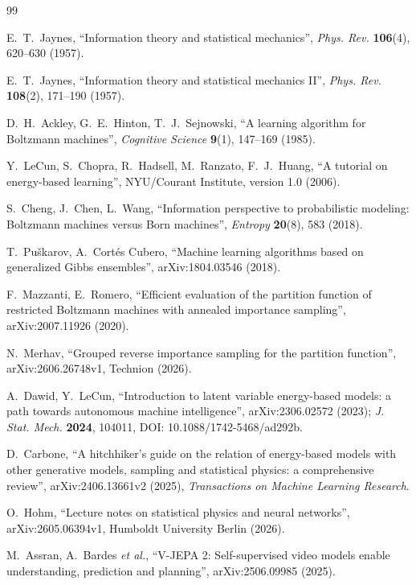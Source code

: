 \documentclass[12pt]{article}
\begin{document}
\begin{thebibliography}{99}

E.~T.~Jaynes, ``Information theory and statistical mechanics'', \textit{Phys. Rev.} \textbf{106}(4), 620--630 (1957).

E.~T.~Jaynes, ``Information theory and statistical mechanics II'', \textit{Phys. Rev.} \textbf{108}(2), 171--190 (1957).

D.~H.~Ackley, G.~E.~Hinton, T.~J.~Sejnowski, ``A learning algorithm for Boltzmann machines'', \textit{Cognitive Science} \textbf{9}(1), 147--169 (1985).

Y.~LeCun, S.~Chopra, R.~Hadsell, M.~Ranzato, F.~J.~Huang, ``A tutorial on energy-based learning'', NYU/Courant Institute, version 1.0 (2006).

S.~Cheng, J.~Chen, L.~Wang, ``Information perspective to probabilistic modeling: Boltzmann machines versus Born machines'', \textit{Entropy} \textbf{20}(8), 583 (2018).

T.~Puškarov, A.~Cortés Cubero, ``Machine learning algorithms based on generalized Gibbs ensembles'', arXiv:1804.03546 (2018).

F.~Mazzanti, E.~Romero, ``Efficient evaluation of the partition function of restricted Boltzmann machines with annealed importance sampling'', arXiv:2007.11926 (2020).

N.~Merhav, ``Grouped reverse importance sampling for the partition function'', arXiv:2606.26748v1, Technion (2026).

A.~Dawid, Y.~LeCun, ``Introduction to latent variable energy-based models: a path towards autonomous machine intelligence'', arXiv:2306.02572 (2023); \textit{J. Stat. Mech.} \textbf{2024}, 104011, DOI: 10.1088/1742-5468/ad292b.

D.~Carbone, ``A hitchhiker's guide on the relation of energy-based models with other generative models, sampling and statistical physics: a comprehensive review'', arXiv:2406.13661v2 (2025), \textit{Transactions on Machine Learning Research}.

O.~Hohm, ``Lecture notes on statistical physics and neural networks'', arXiv:2605.06394v1, Humboldt University Berlin (2026).

M.~Assran, A.~Bardes \emph{et al.}, ``V-JEPA 2: Self-supervised video models enable understanding, prediction and planning'', arXiv:2506.09985 (2025).


\end{thebibliography}
\end{document}
